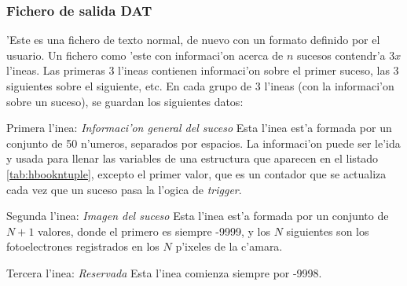 \subsubsection*{Fichero de salida DAT}

'Este es una fichero de texto normal, de nuevo con un formato definido
por el usuario. Un fichero como 'este con informaci'on acerca de $n$
sucesos contendr'a $3 x$ l'ineas. Las primeras 3 l'ineas contienen
informaci'on sobre el primer suceso, las 3 siguientes sobre el
siguiente, etc. En cada grupo de 3 l'ineas (con la informaci'on sobre
un suceso), se guardan los siguientes datos:

\begin{Uentry}
  
\item[Primera l'inea: \emph{Informaci'on general del suceso}] Esta
  l'inea est'a formada por un conjunto de 50 n'umeros, separados por
  espacios. La informaci'on puede ser le'ida y usada para llenar las
  variables de una estructura que aparecen en el listado
  \ref{tab:hbookntuple}, excepto el primer valor, que es un contador
  que se actualiza cada vez que un suceso pasa la l'ogica de
  \emph{trigger}.
  
\item[Segunda l'inea: \emph{Imagen del suceso}] Esta l'inea est'a
  formada por un conjunto de $N+1$ valores, donde el primero es
  siempre -9999, y los $N$ siguientes son los fotoelectrones
  registrados en los $N$ p'ixeles de la c'amara.
  
\item[Tercera l'inea: \emph{Reservada}] Esta l'inea comienza siempre
  por -9998.

\end{Uentry}

